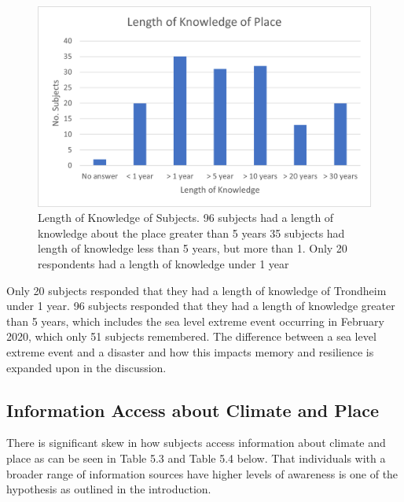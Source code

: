 \begin{figure}[H]
    \centering
    \includegraphics{fig_results/long_know.png}
    \caption{Length of Knowledge of Subjects. 96 subjects had a length of knowledge about the place greater than 5 years 35 subjects had length of knowledge less than 5 years, but more than 1. Only 20 respondents had a length of knowledge under 1 year}
    \label{fig:long_know}
\end{figure}

Only 20 subjects responded that they had a length of knowledge of Trondheim under 1 year. 96 subjects responded that they had a length of knowledge greater than 5 years, which includes the sea level extreme event occurring in February 2020, which only 51 subjects remembered. The difference between a sea level extreme event and a disaster and how this impacts memory and resilience is expanded upon in the discussion.


\subsection{Information Access about Climate and Place}
There is significant skew in how subjects access information about climate and place as can be seen in Table 5.3 and Table 5.4 below. That individuals with a broader range of information sources have higher levels of awareness is one of the hypothesis as outlined in the introduction. 

